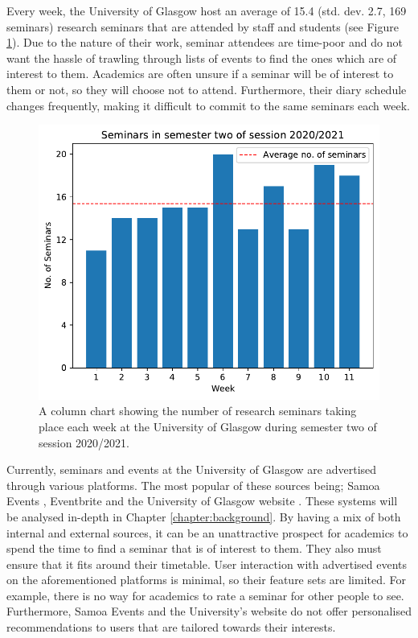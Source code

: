 \documentclass{l4proj}
\begin{document}
Every week, the University of Glasgow host an average of 15.4 (std. dev. 2.7, 169 seminars) research seminars that are attended by staff and students (see Figure \ref{fig:semester_2_seminars}). Due to the nature of their work, seminar attendees are time-poor and do not want the hassle of trawling through lists of events to find the ones which are of interest to them. Academics are often unsure if a seminar will be of interest to them or not, so they will choose not to attend. Furthermore, their diary schedule changes frequently, making it difficult to commit to the same seminars each week.

\begin{figure}[htb]
    \centering
    \includegraphics[width=0.6\linewidth]{images/semester_2_seminars.pdf}    
    \caption{A column chart showing the number of research seminars taking place each week at the University of Glasgow during semester two of session 2020/2021.}
    \label{fig:semester_2_seminars} 
\end{figure}

Currently, seminars and events at the University of Glasgow are advertised through various platforms. The most popular of these sources being; Samoa Events \citep{samoa}, Eventbrite \citep{eventbrite} and the University of Glasgow website \citep{uofg}. These systems will be analysed in-depth in Chapter \ref{chapter:background}. By having a mix of both internal and external sources, it can be an unattractive prospect for academics to spend the time to find a seminar that is of interest to them. They also must ensure that it fits around their timetable. User interaction with advertised events on the aforementioned platforms is minimal, so their feature sets are limited. For example, there is no way for academics to rate a seminar for other people to see. Furthermore, Samoa Events and the University's website do not offer personalised recommendations to users that are tailored towards their interests.
\end{document}
